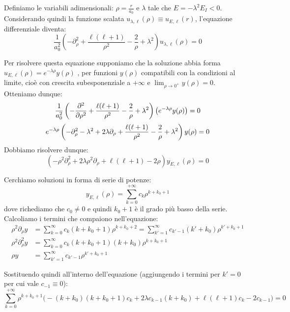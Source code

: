 Definiamo le variabili adimensionali: 
\(
\rho = \frac{r}{a_0}
\)
e \( \lambda \) tale che \( E = - \lambda^2 E_I < 0 \).
Considerando quindi la funzione scalata \( u_{\lambda, \ell}(\rho) \equiv u_{E,\ell}(r) \), l'equazione differenziale diventa:
\[
\frac{1}{a_0^2} \left( -\partial_\rho^2 + \frac{\ell(\ell+1)}{\rho^2} - \frac{2}{\rho} + \lambda^2 \right) u_{\lambda,\ell}(\rho) = 0
\]

Per risolvere questa equazione supponiamo che la soluzione abbia forma \(u_{E,\ell}(\rho)= e^{-\lambda\rho}y(\rho) \) ,
per funzioni \(y(\rho)\) compatibili con la condizioni al limite, cioè con crescita subesponenziale a \(+\infty\) e \(\lim_{\rho\to 0^+}y(\rho)=0\).\\
Otteniamo dunque:
\[
    \frac{1}{a_0^2} \left( - \frac{\partial^2}{\partial \rho^2} + \frac{\ell(\ell+1)}{\rho^2} - \frac{2}{\rho} + \lambda^2 \right) \left( e^{-\lambda \rho} y(\rho) \right) = 0 \\
\]
\[
    e^{-\lambda \rho} \left( -\partial_\rho^2 - \lambda^2 + 2\lambda \partial_\rho + \frac{\ell(\ell+1)}{\rho^2} - \frac{2}{\rho} + \lambda^2 \right) y(\rho) = 0\\
\]
Dobbiamo risolvere dunque:
\begin{equation}
    \left( -\rho^2 \partial_\rho^2 + 2\lambda \rho^2 \partial_\rho + \ell(\ell+1) - 2\rho \right) y_{E,\ell}(\rho) = 0
\end{equation}


Cerchiamo soluzioni in forma di serie di potenze:
\begin{equation}
    y_{E, \ell}(\rho)=  \sum_{k = 0}^{+\infty}c_k \rho^{k+k_0+1}
\end{equation}
dove richediamo che \(c_0 \neq 0\) e quindi \(k_0+1\) è il grado più basso della serie.
Calcoliamo i termini che compaiono nell'equazione:
\begin{align*}
\rho^2 \partial_\rho y &= \sum_{k=0}^{\infty} c_k (k+k_0+1) \rho^{k+k_0+2} = \sum_{k'=1}^{\infty} c_{k'-1} (k'+k_0) \rho^{k'+k_0+1} \\
\rho^2 \partial_\rho^2 y &= \sum_{k=0}^{\infty} c_k (k+k_0+1)(k+k_0) \rho^{k+k_0+1} \\
\rho y &= \sum_{k'=1}^{\infty} c_{k'-1} \rho^{k'+k_0+1}
\end{align*}

Sostituendo quindi all'interno dell'equazione (aggiungendo i termini per \(k' = 0\) per cui vale \(c_{-1}\equiv0\)):
\begin{equation}
    \sum_{k=0}^{+\infty} \rho^{k+k_0+1} \big( -(k+k_0)(k+k_0+1)c_k + 2\lambda c_{k-1}(k+k_0) + \ell(\ell+1)c_k - 2c_{k-1} \big) = 0
\end{equation}

